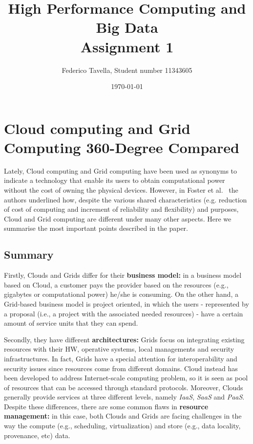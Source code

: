 \documentclass[a4paper]{IEEEtran}
\title{High Performance Computing and Big Data \\ Assignment 1}
\author{Federico Tavella, Student number 11343605}
\date{\today}
\begin{document}
\maketitle

\section{Cloud computing and Grid Computing 360-Degree Compared}

Lately, Cloud computing and Grid computing have been used as synonyms to indicate a technology that enable its users to obtain computational power without the cost of owning the physical devices. However, in Foster et al.~\cite{CloudGrid} the authors underlined how, despite the various shared characteristics (e.g. reduction of cost of computing and increment of reliability and flexibility) and purposes, Cloud and Grid computing are different under many other aspects. Here we summarise the most important points described in the paper. 

\subsection{Summary}

Firstly, Clouds and Grids differ for their \textbf{business model:} in a business model based on Cloud, a customer pays the provider based on the resources (e.g., gigabytes or computational power) he/she is consuming. On the other hand, a Grid-based business model is project oriented, in which the users - represented by a proposal (i.e., a project with the associated needed resources) - have a certain amount of service units that they can spend.

Secondly, they have different \textbf{architectures:} Grids focus on integrating existing resources with their HW, operative systems, local managements and security infrastructures. In fact, Grids have a special attention for interoperability and security issues since resources come from different domains. Cloud instead has been developed to address Internet-scale computing problem, so it is seen as pool of resources that can be accessed through standard protocols. Moreover, Clouds generally provide services at three different levels, namely \textit{IaaS}, \textit{SaaS} and \textit{PaaS}.
Despite these differences, there are some common flaws in \textbf{resource management:} in this case, both Clouds and Grids are facing challenges in the way the compute (e.g., scheduling, virtualization) and store (e.g., data locality, provenance, etc) data.
\end{document}
